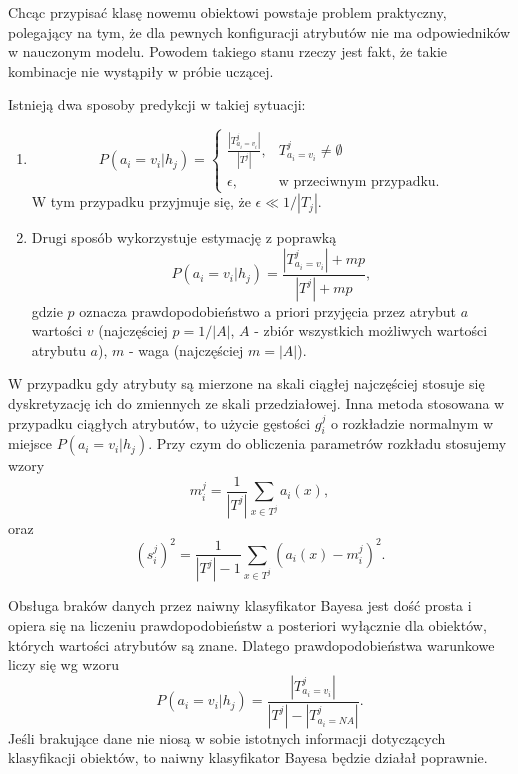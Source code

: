 \documentclass[
]{book}
\providecommand{\tightlist}{%
  \setlength{\itemsep}{0pt}\setlength{\parskip}{0pt}}
\theoremstyle{plain}
\theoremstyle{definition}
\theoremstyle{definition}
\theoremstyle{definition}
\theoremstyle{definition}
\theoremstyle{definition}
\theoremstyle{remark}
\begin{document}
Chcąc przypisać klasę nowemu obiektowi powstaje problem praktyczny, polegający na tym, że dla pewnych konfiguracji atrybutów nie ma odpowiedników w nauczonym modelu. Powodem takiego stanu rzeczy jest fakt, że takie kombinacje nie wystąpiły w próbie uczącej.

Istnieją dwa sposoby predykcji w takiej sytuacji:

\begin{enumerate}
\def\labelenumi{\arabic{enumi}.}
\tightlist
\item
  \begin{equation}\label{pred1}
           P(a_i=v_i|h_j)=
           \begin{cases}
               \frac{|T^j_{a_i=v_i}|}{|T^j|}, & T^j_{a_i=v_i}\neq \emptyset\\
               \epsilon, & \text{w przeciwnym przypadku.}
           \end{cases}
   \end{equation}
  W tym przypadku przyjmuje się, że \(\epsilon \ll 1/|T_j|\).
\item
  Drugi sposób wykorzystuje estymację z poprawką
  \begin{equation}\label{pred2}
       P(a_i=v_i|h_j)=\frac{|T^j_{a_i=v_i}|+mp}{|T^j|+mp},
  \end{equation}
  gdzie \(p\) oznacza prawdopodobieństwo a priori przyjęcia przez atrybut \(a\) wartości \(v\) (najczęściej \(p=1/|A|\), \(A\) - zbiór wszystkich możliwych wartości atrybutu \(a\)), \(m\) - waga (najczęściej \(m=|A|\)).
\end{enumerate}

W przypadku gdy atrybuty są mierzone na skali ciągłej najczęściej stosuje się dyskretyzację ich do zmiennych ze skali przedziałowej. Inna metoda stosowana w przypadku ciągłych atrybutów, to użycie gęstości \(g_i^j\) o rozkładzie normalnym w miejsce \(P(a_i=v_i|h_j)\). Przy czym do obliczenia parametrów rozkładu stosujemy wzory
\begin{equation}\label{sred}
        m_i^j=\frac{1}{|T^j|}\sum_{x\in T^j}a_i(x),
\end{equation}
oraz
\begin{equation}\label{odch}
        (s_i^j)^2=\frac{1}{|T^j|-1}\sum_{x\in T^j}(a_i(x)-m_i^j)^2.
\end{equation}

Obsługa braków danych przez naiwny klasyfikator Bayesa jest dość prosta i opiera się na liczeniu prawdopodobieństw a posteriori wyłącznie dla obiektów, których wartości atrybutów są znane. Dlatego prawdopodobieństwa warunkowe liczy się wg wzoru
\begin{equation}\label{pr_war}
        P(a_i=v_i|h_j)=\frac{|T^j_{a_i=v_i}|}{|T^j|-|T^j_{a_i=NA}|}.
\end{equation}
Jeśli brakujące dane nie niosą w sobie istotnych informacji dotyczących klasyfikacji obiektów, to naiwny klasyfikator Bayesa będzie działał poprawnie.
\end{document}
